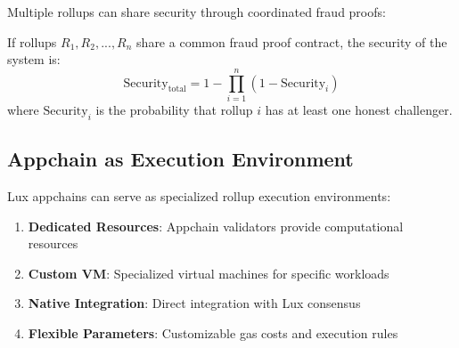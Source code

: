 Multiple rollups can share security through coordinated fraud proofs:

\begin{proposition}
If rollups $R_1, R_2, ..., R_n$ share a common fraud proof contract, the security of the system is:
\begin{equation}
\text{Security}_{\text{total}} = 1 - \prod_{i=1}^{n}(1 - \text{Security}_i)
\end{equation}
where $\text{Security}_i$ is the probability that rollup $i$ has at least one honest challenger.
\end{proposition}

\subsection{Appchain as Execution Environment}

Lux appchains can serve as specialized rollup execution environments:

\begin{enumerate}
    \item \textbf{Dedicated Resources}: Appchain validators provide computational resources
    \item \textbf{Custom VM}: Specialized virtual machines for specific workloads
    \item \textbf{Native Integration}: Direct integration with Lux consensus
    \item \textbf{Flexible Parameters}: Customizable gas costs and execution rules
\end{enumerate}

